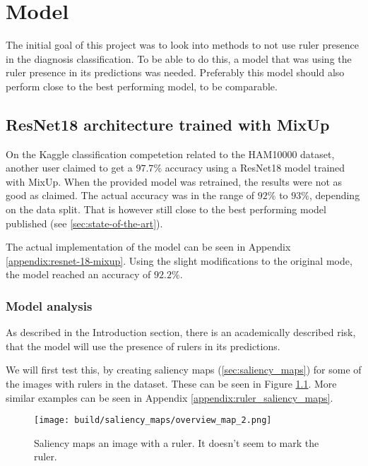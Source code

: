 \chapter{Model}
The initial goal of this project was to look into methods to not use ruler presence in the
diagnosis classification.
To be able to do this, a model that was using the ruler presence in its predictions was needed.
Preferably this model should also perform close to the best performing model, to be comparable.

\section{ResNet18 architecture trained with MixUp}
On the Kaggle classification competetion related to the HAM10000 dataset\cite{HAM10000-kaggle-competetion},
another user claimed to get a $97.7\%$ accuracy using a ResNet18 model trained with MixUp\cite{kaggle-97-model}.
When the provided model was retrained, the results were not as good as claimed.
The actual accuracy was in the range of $92\%$ to $93\%$, depending on the data split.
That is however still close to the best performing model published (see \ref{sec:state-of-the-art}).

The actual implementation of the model can be seen in Appendix \ref{appendix:resnet-18-mixup}.
Using the slight modifications to the original mode, the model reached an accuracy of $92.2\%$.

\subsection{Model analysis}
As described in the Introduction section, there is an academically described risk,
that the model will use the presence of rulers in its predictions. %

We will first test this, by creating saliency maps (\ref{sec:saliency_maps}) for some of the images with rulers in the dataset.
These can be seen in Figure \ref{fig:ruler_saliency_map}.
More similar examples can be seen in Appendix \ref{appendix:ruler_saliency_maps}.

\begin{figure}
    \texttt{[image: build/saliency\_maps/overview\_map\_2.png]}
    \caption{Saliency maps an image with a ruler. It doesn't seem to mark the ruler.}
    \label{fig:ruler_saliency_map}
\end{figure}
